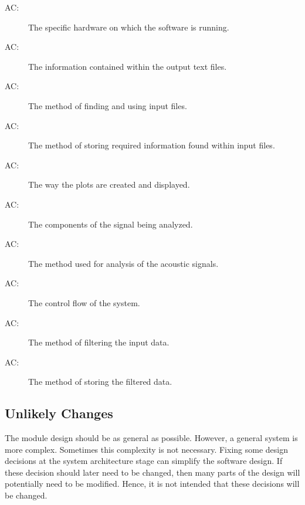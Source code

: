 \documentclass[12pt]{article}
\newcounter{acnum}
\newcommand{\actheacnum}{AC\theacnum}
\begin{document}
\begin{description}
\item[ \actheacnum \label{acHardware}:] The specific
  hardware on which the software is running.
\item[ \actheacnum \label{acOutput}:] The information 
contained within the output text files.
\item[ \actheacnum \label{acFileFinding}:] The method of 
finding and using input files.
\item[ \actheacnum \label{acFileStoring}:] The method of 
storing required information found within input files.
\item[ \actheacnum \label{acPlot}:] The way the plots are 
created and displayed.
\item[ \actheacnum \label{acAnalyze}:] The components of 
the signal being analyzed.
\item[ \actheacnum \label{acMethod}:] The method used for 
analysis of the acoustic signals.
\item[ \actheacnum \label{acControl}:] The control flow of 
the system.
\item[ \actheacnum \label{acFilter}:] The method of 
filtering the input data.
\item[ \actheacnum \label{acFilterInfo}:] The method of 
storing the filtered data.
\end{description}


\subsection{Unlikely Changes} \label{SecUchange}

The module design should be as general as possible. However, a general system is
more complex. Sometimes this complexity is not necessary. Fixing some design
decisions at the system architecture stage can simplify the software design. If
these decision should later need to be changed, then many parts of the design
will potentially need to be modified. Hence, it is not intended that these
decisions will be changed. 

\end{document}
